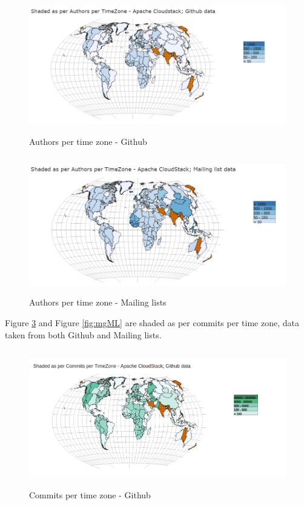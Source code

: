 \documentclass[double,12pt]{beavtex}
\begin{document}
\begin{figure}[H]
\centering
\includegraphics[width=130mm,height=60mm]{image4.PNG}
\caption{Authors per time zone - Github}
\label{fig:auHub}
\end{figure}

\begin{figure}[H]
\centering
\includegraphics[width=130mm,height=60mm]{image5.PNG}
\caption{Authors per time zone - Mailing lists}
\label{fig:auML}
\end{figure}

Figure \ref{fig:coHub} and Figure \ref{fig:mgML} are shaded as per commits per time zone, data taken from both Github and Mailing lists.

\begin{figure}[H]
\centering
\includegraphics[width=130mm,height=60mm]{image6.png}
\caption{Commits per time zone - Github}
\label{fig:coHub}
\end{figure}
\end{document}
